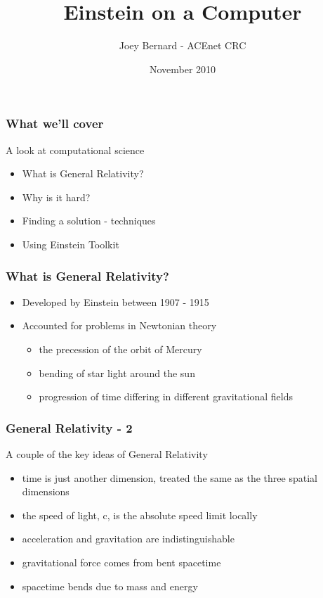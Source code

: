 \documentclass{beamer}
\title{Einstein on a Computer}
\author{Joey Bernard - ACEnet CRC}
\date{November 2010}
\begin{document}
\maketitle

\begin{frame}
  \frametitle{What we'll cover}
  A look at computational science
  \begin{itemize}
    \item What is General Relativity?
    \item Why is it hard?
    \item Finding a solution - techniques
    \item Using Einstein Toolkit
  \end{itemize}
\end{frame}

\begin{frame}
  \frametitle{What is General Relativity?}
  \begin{itemize}
    \item Developed by Einstein between 1907 - 1915
    \item Accounted for problems in Newtonian theory
    \begin{itemize}
      \item the precession of the orbit of Mercury
      \item bending of star light around the sun
      \item progression of time differing in different gravitational fields
    \end{itemize}
  \end{itemize}
\end{frame}

\begin{frame}
  \frametitle{General Relativity - 2}
  A couple of the key ideas of General Relativity
  \begin{itemize}
    \item time is just another dimension, treated the same as the three spatial dimensions
    \item the speed of light, c, is the absolute speed limit locally
    \item acceleration and gravitation are indistinguishable
    \item gravitational force comes from bent spacetime
    \item spacetime bends due to mass and energy
  \end{itemize}
\end{frame}
\end{document}
